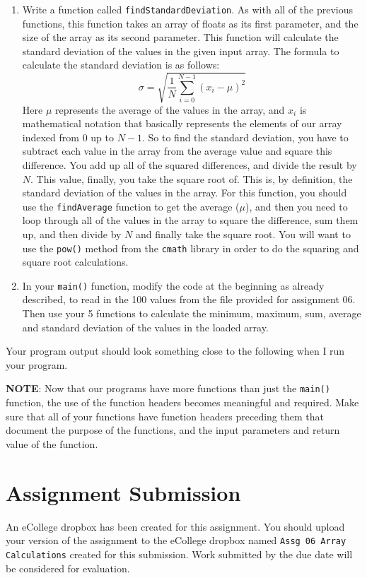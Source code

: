 \documentclass[11pt]{article}
\begin{document}
\begin{enumerate}
\item Write a function called \verb~findStandardDeviation~.  As with all of the
previous functions, this function takes an array of floats as its
first parameter, and the size of the array as its second parameter.
This function will calculate the standard deviation of the values
in the given input array.  The formula to calculate the standard deviation
is as follows:
$$
   \sigma = \sqrt{\frac{1}{N} \sum_{i=0}^{N-1} (x_i - \mu)^2}
   $$
Here $\mu$ represents the average of the values in the array, and $x_i$ is
mathematical notation that basically represents the elements of our array
indexed from $0$ up to $N-1$.  So to find the standard deviation, you
have to subtract each value in the array from the average value and
square this difference.  You add up all of the squared differences, and
divide the result by $N$.  This value, finally, you take the
square root of.  This is, by definition, the standard deviation
of the values in the array.  For this function, you should use the
\verb~findAverage~ function to get the average ($\mu$), and then
you need to loop through all of the values in the array to 
square the difference, sum them up, and then divide by $N$ and
finally take the square root.  You will want to use the \verb~pow()~
method from the \verb~cmath~ library in order to do the squaring and
square root calculations.

\item In your \verb~main()~ function, modify the code at the beginning
as already described, to read in the 100 values from the
file provided for assignment 06.  Then use your 5 functions to calculate
the minimum, maximum, sum, average and standard deviation of the values
in the loaded array.
\end{enumerate}

Your program output should look something close to the following when I
run your program. 

\textbf{NOTE}: Now that our programs have more functions than just the
\verb~main()~ function, the use of the function headers becomes meaningful
and required.  Make sure that all of your functions have function
headers preceding them that document the purpose of the functions, and
the input parameters and return value of the function.
\section*{Assignment Submission}
\label{sec-4}

An eCollege dropbox has been created for this assignment.  You should
upload your version of the assignment to the eCollege dropbox named
\verb~Assg 06 Array Calculations~ created for this submission.  Work
submitted by the due date will be considered for evaluation.
\end{document}
